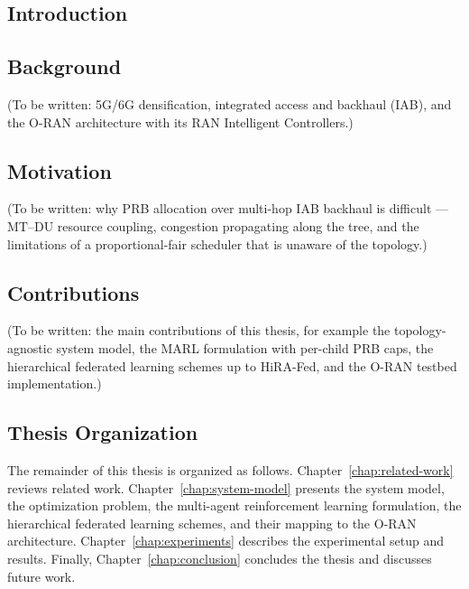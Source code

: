 \begin{EnChapter}

\chapter{Introduction}
\label{chap:introduction}


\section{Background}
\label{sec:background}

(To be written: 5G/6G densification, integrated access and backhaul (IAB), and the
O-RAN architecture with its RAN Intelligent Controllers.)

\section{Motivation}
\label{sec:motivation}

(To be written: why PRB allocation over multi-hop IAB backhaul is difficult ---
MT--DU resource coupling, congestion propagating along the tree, and the limitations
of a proportional-fair scheduler that is unaware of the topology.)

\section{Contributions}
\label{sec:contributions}

(To be written: the main contributions of this thesis, for example the
topology-agnostic system model, the MARL formulation with per-child PRB caps, the
hierarchical federated learning schemes up to HiRA-Fed, and the O-RAN testbed
implementation.)

\section{Thesis Organization}
\label{sec:organization}

The remainder of this thesis is organized as follows.
Chapter~\ref{chap:related-work} reviews related work.
Chapter~\ref{chap:system-model} presents the system model, the optimization problem,
the multi-agent reinforcement learning formulation, the hierarchical federated
learning schemes, and their mapping to the O-RAN architecture.
Chapter~\ref{chap:experiments} describes the experimental setup and results.
Finally, Chapter~\ref{chap:conclusion} concludes the thesis and discusses future work.

\end{EnChapter}

